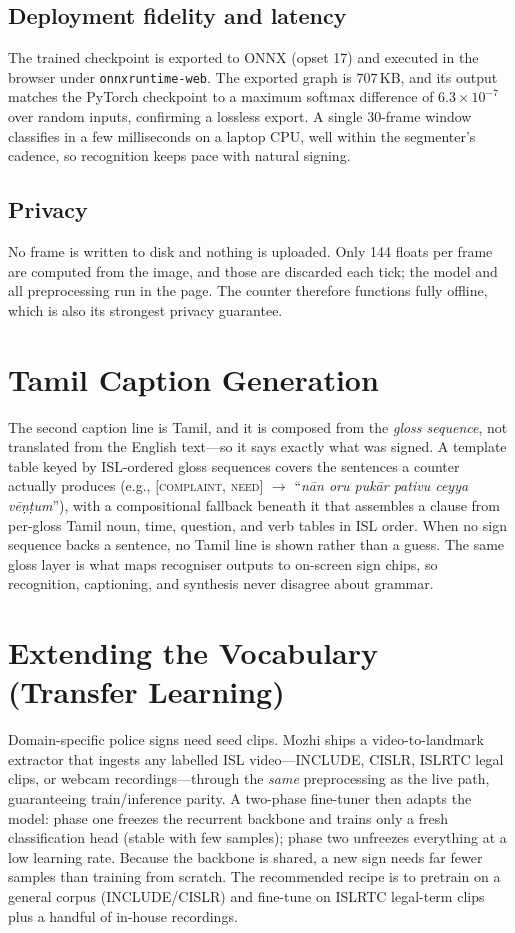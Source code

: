 \documentclass[conference]{IEEEtran}
\begin{document}
\subsection{Deployment fidelity and latency}
The trained checkpoint is exported to ONNX (opset 17) and executed in the
browser under \texttt{onnxruntime-web}. The exported graph is $707$\,KB, and its
output matches the PyTorch checkpoint to a maximum softmax difference of
$6.3\times10^{-7}$ over random inputs, confirming a lossless export. A single
30-frame window classifies in a few milliseconds on a laptop CPU, well within
the segmenter's cadence, so recognition keeps pace with natural signing.

\subsection{Privacy}
No frame is written to disk and nothing is uploaded. Only 144 floats per frame
are computed from the image, and those are discarded each tick; the model and
all preprocessing run in the page. The counter therefore functions fully
offline, which is also its strongest privacy guarantee.

\section{Tamil Caption Generation}
The second caption line is Tamil, and it is composed from the \emph{gloss
sequence}, not translated from the English text---so it says exactly what was
signed. A template table keyed by ISL-ordered gloss sequences covers the
sentences a counter actually produces (e.g., \textsc{[complaint, need]}
$\rightarrow$ ``\emph{n\=an oru puk\=ar pativu ceyya v\=e\d{n}\d{t}um}''), with a
compositional fallback beneath it that assembles a clause from per-gloss Tamil
noun, time, question, and verb tables in ISL order. When no sign sequence backs
a sentence, no Tamil line is shown rather than a guess. The same gloss layer is
what maps recogniser outputs to on-screen sign chips, so recognition, captioning,
and synthesis never disagree about grammar.

\section{Extending the Vocabulary (Transfer Learning)}
Domain-specific police signs need seed clips. Mozhi ships a video-to-landmark
extractor that ingests any labelled ISL video---INCLUDE, CISLR, ISLRTC legal
clips, or webcam recordings---through the \emph{same} preprocessing as the live
path, guaranteeing train/inference parity. A two-phase fine-tuner then adapts the
model: phase one freezes the recurrent backbone and trains only a fresh
classification head (stable with few samples); phase two unfreezes everything at
a low learning rate. Because the backbone is shared, a new sign needs far fewer
samples than training from scratch. The recommended recipe is to pretrain on a
general corpus (INCLUDE/CISLR) and fine-tune on ISLRTC legal-term clips plus a
handful of in-house recordings.
\end{document}
